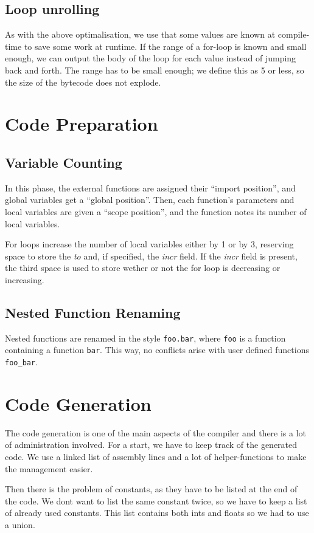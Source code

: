 \documentclass[a4paper,11pt]{report}
\begin{document}
\subsection{Loop unrolling}
As with the above optimalisation, we use that some values are known at compile-time to save some work at runtime.
If the range of a for-loop is known and small enough, we can output the body of the loop for each value instead of jumping back and forth.
The range has to be small enough; we define this as 5 or less, so the size of the bytecode does not explode.


\section{Code Preparation}
\subsection{Variable Counting}
In this phase, the external functions are assigned their ``import position'', and global variables get a ``global position''. Then, each function's parameters and local variables are given a ``scope position'', and the function notes its number of local variables. 

For loops increase the number of local variables either by 1 or by 3, reserving space to store the \emph{to} and, if specified, the \emph{incr} field. If the \emph{incr} field is present, the third space is used to store wether or not the for loop is decreasing or increasing.
\subsection{Nested Function Renaming}
Nested functions are renamed in the style \texttt{foo.bar}, where \texttt{foo} is a function containing a function \texttt{bar}. This way, no conflicts arise with user defined functions \texttt{foo\_bar}.

\section{Code Generation}
The code generation is one of the main aspects of the compiler and there is a lot of administration involved.
For a start, we have to keep track of the generated code.
We use a linked list of assembly lines and a lot of helper-functions to make the management easier.

Then there is the problem of constants, as they have to be listed at the end of the code.
We dont want to list the same constant twice, so we have to keep a list of already used constants.
This list contains both ints and floats so we had to use a union.
 
\end{document}
